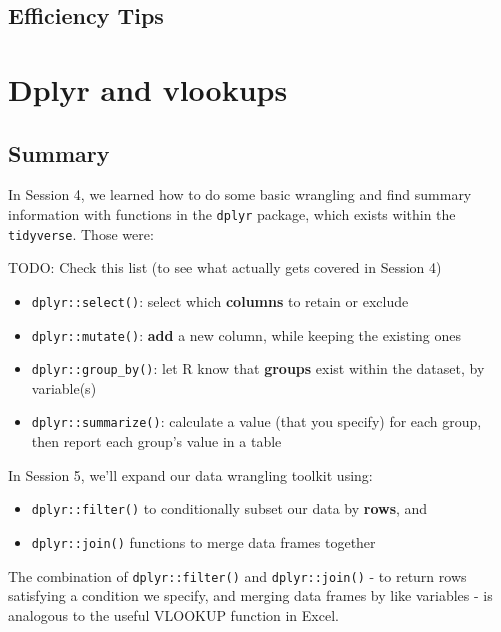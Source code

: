 \documentclass[]{book}
\providecommand{\tightlist}{%
  \setlength{\itemsep}{0pt}\setlength{\parskip}{0pt}}
\begin{document}
\hypertarget{efficiency-tips-3}{%
\section{Efficiency Tips}\label{efficiency-tips-3}}

\hypertarget{vlookup}{%
\chapter{Dplyr and vlookups}\label{vlookup}}

\hypertarget{summary-1}{%
\section{Summary}\label{summary-1}}

In Session 4, we learned how to do some basic wrangling and find summary information with functions in the \texttt{dplyr} package, which exists within the \texttt{tidyverse}. Those were:

TODO: Check this list (to see what actually gets covered in Session 4)

\begin{itemize}
\tightlist
\item
  \texttt{dplyr::select()}: select which \textbf{columns} to retain or exclude
\item
  \texttt{dplyr::mutate()}: \textbf{add} a new column, while keeping the existing ones
\item
  \texttt{dplyr::group\_by()}: let R know that \textbf{groups} exist within the dataset, by variable(s)
\item
  \texttt{dplyr::summarize()}: calculate a value (that you specify) for each group, then report each group's value in a table
\end{itemize}

In Session 5, we'll expand our data wrangling toolkit using:

\begin{itemize}
\tightlist
\item
  \texttt{dplyr::filter()} to conditionally subset our data by \textbf{rows}, and
\item
  \texttt{dplyr::join()} functions to merge data frames together
\end{itemize}

The combination of \texttt{dplyr::filter()} and \texttt{dplyr::join()} - to return rows satisfying a condition we specify, and merging data frames by like variables - is analogous to the useful VLOOKUP function in Excel.
\end{document}
